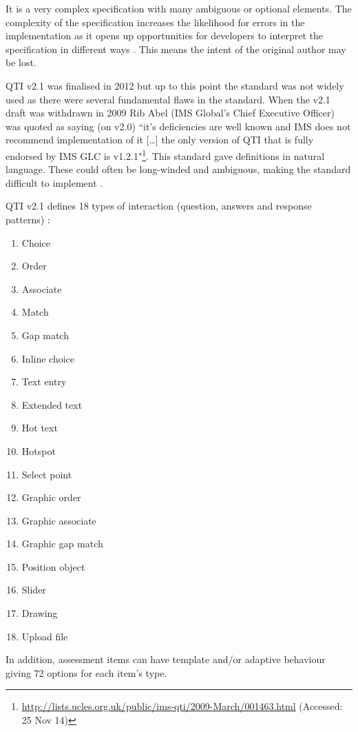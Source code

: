 It is a very complex specification with many ambiguous or optional elements. The complexity of the specification increases the likelihood for errors in the implementation as it opens up opportunities for developers to interpret the specification in different ways \citep{failQTI}. This means the intent of the original author may be lost.

\gls{QTI} v2.1 was finalised in 2012 \citep{qtiOverview} but up to this point the standard was not widely used \citep{eps265979} as there were several fundamental flaws in the standard. When the v2.1 draft was withdrawn in 2009 Rib Abel (IMS Global's Chief Executive Officer) was quoted as saying (on v2.0) ``it’s deficiencies are well known and IMS does not recommend implementation of it [\dots] the only version of QTI that is fully endorsed by IMS GLC is v1.2.1"\footnote{\url{http://lists.ucles.org.uk/public/ims-qti/2009-March/001463.html} (Accessed: 25 Nov 14)}. This standard gave definitions in natural language. These could often be long-winded and ambiguous, making the standard difficult to implement \citep{failQTI, Sclater2007}.

\gls{QTI} v2.1 defines 18 types of interaction (question, answers and response patterns) \citep{qtiImplementation}:
\begin{multicols}{3}
\begin{enumerate}
\item Choice
\item Order
\item Associate
\item Match
\item Gap match
\item Inline choice
\item Text entry
\item Extended text
\item Hot text
\item Hotspot
\item Select point
\item Graphic order
\item Graphic associate
\item Graphic gap match
\item Position object
\item Slider
\item Drawing
\item Upload file
\end{enumerate}
\end{multicols}

In addition, assessment items can have template and/or adaptive behaviour giving 72 options for each item's type. 


